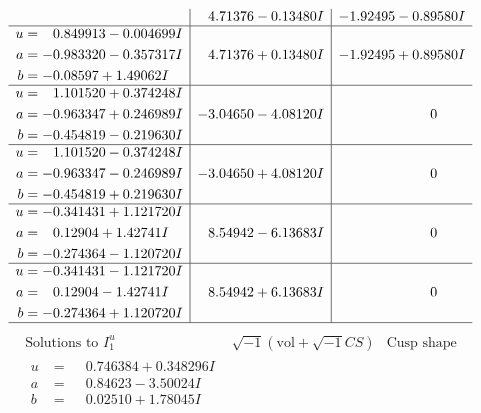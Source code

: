 \documentclass[1p]{elsarticle_modified}
\theoremstyle{definition}
\newcommand{\I}{\sqrt{-1}}
\begin{document}
$$\begin{array}{c|c|c}
 & \phantom{-}4.71376 - 0.13480 I & -1.92495 - 0.89580 I \\ \hline\begin{aligned}
u &= \phantom{-}0.849913 - 0.004699 I \\
a &= -0.983320 - 0.357317 I \\
b &= -0.08597 + 1.49062 I\end{aligned}
 & \phantom{-}4.71376 + 0.13480 I & -1.92495 + 0.89580 I \\ \hline\begin{aligned}
u &= \phantom{-}1.101520 + 0.374248 I \\
a &= -0.963347 + 0.246989 I \\
b &= -0.454819 - 0.219630 I\end{aligned}
 & -3.04650 - 4.08120 I & \phantom{-0.000000 } 0 \\ \hline\begin{aligned}
u &= \phantom{-}1.101520 - 0.374248 I \\
a &= -0.963347 - 0.246989 I \\
b &= -0.454819 + 0.219630 I\end{aligned}
 & -3.04650 + 4.08120 I & \phantom{-0.000000 } 0 \\ \hline\begin{aligned}
u &= -0.341431 + 1.121720 I \\
a &= \phantom{-}0.12904 + 1.42741 I \\
b &= -0.274364 - 1.120720 I\end{aligned}
 & \phantom{-}8.54942 - 6.13683 I & \phantom{-0.000000 } 0 \\ \hline\begin{aligned}
u &= -0.341431 - 1.121720 I \\
a &= \phantom{-}0.12904 - 1.42741 I \\
b &= -0.274364 + 1.120720 I\end{aligned}
 & \phantom{-}8.54942 + 6.13683 I & \phantom{-0.000000 } 0\\
 \hline 
 \end{array}$$\newpage$$\begin{array}{c|c|c}  
\text{Solutions to }I^u_{1}& \I (\text{vol} + \sqrt{-1}CS) & \text{Cusp shape}\\
 \hline 
\begin{aligned}
u &= \phantom{-}0.746384 + 0.348296 I \\
a &= \phantom{-}0.84623 - 3.50024 I \\
b &= \phantom{-}0.02510 + 1.78045 I\end{aligned}

\end{array}$$
\end{document}
